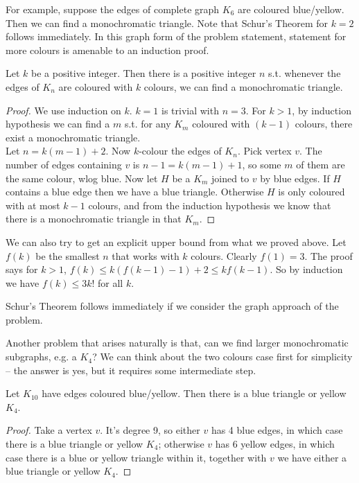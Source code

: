 \documentclass[a4paper]{article}
\begin{document}
For example, suppose the edges of complete graph $K_6$ are coloured blue/yellow. Then we can find a monochromatic triangle. Note that Schur's Theorem for $k=2$ follows immediately. In this graph form of the problem statement, statement for more colours is amenable to an induction proof.

\begin{prop}
Let $k$ be a positive integer. Then there is a positive integer $n$ s.t. whenever the edges of $K_n$ are coloured with $k$ colours, we can find a monochromatic triangle.
\begin{proof}
We use induction on $k$. $k=1$ is trivial with $n=3$.
For $k>1$, by induction hypothesis we can find a $m$ s.t. for any $K_m$ coloured with $(k-1)$ colours, there exist a monochromatic triangle.\\
Let $n=k(m-1)+2$. Now $k$-colour the edges of $K_n$. Pick vertex $v$. The number of edges containing $v$ is $n-1=k(m-1)+1$, so some $m$ of them are the same colour, wlog blue. Now let $H$ be a $K_m$ joined to $v$ by blue edges. If $H$ contains a blue edge then we have a blue triangle. Otherwise $H$ is only coloured with at most $k-1$ colours, and from the induction hypothesis we know that there is a monochromatic triangle in that $K_m$.
\end{proof}
\end{prop}

\begin{rem}
We can also try to get an explicit upper bound from what we proved above. Let $f(k)$ be the smallest $n$ that works with $k$ colours. Clearly $f(1) = 3$. The proof says for $k>1$, $f(k) \leq k(f(k-1)-1)+2 \leq kf(k-1)$. So by induction we have $f(k) \leq 3k!$ for all $k$.
\end{rem}

\begin{rem}
Schur's Theorem follows immediately if we consider the graph approach of the problem.
\end{rem}

Another problem that arises naturally is that, can we find larger monochromatic subgraphs, e.g. a $K_4$? We can think about the two colours case first for simplicity -- the answer is yes, but it requires some intermediate step.

\begin{eg}
Let $K_{10}$ have edges coloured blue/yellow. Then there is a blue triangle or yellow $K_4$.
\begin{proof}
Take a vertex $v$. It's degree 9, so either $v$ has 4 blue edges, in which case there is a blue triangle or yellow $K_4$; otherwise $v$ has 6 yellow edges, in which case there is a blue or yellow triangle within it, together with $v$ we have either a blue triangle or yellow $K_4$.
\end{proof}
\end{eg}
\end{document}
